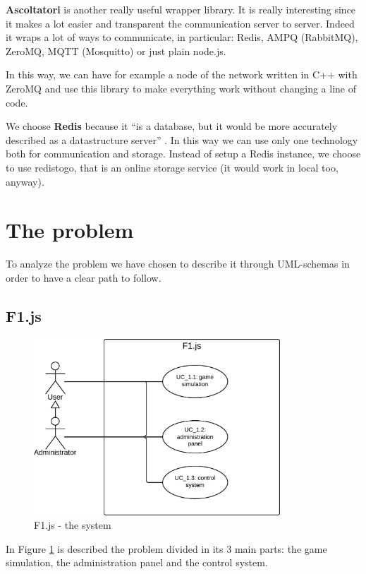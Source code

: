 \textbf{Ascoltatori} is another really useful wrapper library. It is really interesting since it makes a lot easier and transparent the communication server to server. Indeed it wraps a lot of ways to communicate, in particular: Redis, AMPQ (RabbitMQ), ZeroMQ, MQTT (Mosquitto) or just plain node.js.

In this way, we can have for example a node of the network written in C++ with ZeroMQ and use this library to make everything work without changing a line of code.

We choose \textbf{Redis} because it ``is a database, but it would be more accurately described as a datastructure server'' \cite{book:smashing}. In this way we can use only one technology both for communication and storage. Instead of setup a Redis instance, we choose to use redistogo, that is an online storage service (it would work in local too, anyway).

\section{The problem}
\label{sec:theProblem}

To analyze the problem we have chosen to describe it through UML-schemas in order to have a clear path to follow.

\subsection{F1.js}

\begin{figure}[H]
\centering %
\includegraphics[height=250px]{./img/UML/F1Js.png}
\caption{F1.js - the system}
\label{fig:F1jsUC}
\end{figure}

In Figure \ref{fig:F1jsUC} is described the problem divided in its 3 main parts: the game simulation, the administration panel and the control system.

